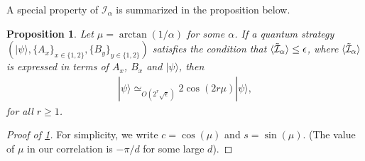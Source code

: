 \documentclass[11pt,letterpaper]{article}
\newcommand{\ket}[1]{|#1\rangle}
\DeclarePairedDelimiter{\ip}{\langle}{\rangle}
\newcommand{\1}{\mathbb{1}}
\newcommand{\I}{\mathcal{I}}
\newcommand{\appd}[1]{\simeq_{#1}}
\newtheorem{proposition}[theorem]{Proposition}
\theoremstyle{definition}
\begin{document}
A special property of $\I_\alpha$ is summarized in the proposition below.
\begin{proposition}
\label{prop:2d-subspace}
	Let $\mu = \arctan(1/\alpha)$ for some $\alpha$.
	If a quantum strategy $(\ket{\psi}, \{A_x\}_{x \in \{1,2\}}, \{B_y\}_{y \in \{1,2\}})$ 
	satisfies the condition that $\ip{\tilde{\I}_\alpha} \leq \epsilon$, where 
	$\ip{\tilde{\I}_\alpha}$ is expressed in terms of $A_x$,  $B_x$ and $\ket{\psi}$,
	then  
	\begin{align}
		[(B_0 B_1)^r + (B_1B_0)^r] \ket{\psi} \appd{O(2^{r}\sqrt{\epsilon})} 2\cos(2r\mu)\ket{\psi},
	\end{align}
	for all $r \geq 1$.
\end{proposition}
\begin{proof}[Proof of \cref{prop:2d-subspace}]
	For simplicity, we write $c = \cos(\mu)$ and $s = \sin(\mu)$.
	(The value of $\mu$ in our correlation is $-\pi/d$ for some large $d$).
	

\end{proof}
\end{document}
